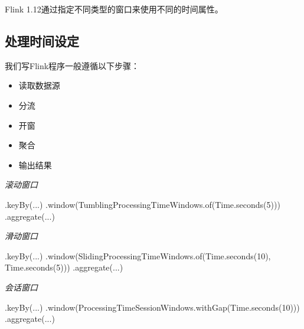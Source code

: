 \documentclass[cn,11pt,chinese]{elegantbook}
\newenvironment{Shaded}{}{}
\newcommand{\BuiltInTok}[1]{#1}
\newcommand{\DecValTok}[1]{\textcolor[rgb]{0.25,0.63,0.44}{#1}}
\newcommand{\FunctionTok}[1]{\textcolor[rgb]{0.02,0.16,0.49}{#1}}
\newcommand{\NormalTok}[1]{#1}
\providecommand{\tightlist}{%
  \setlength{\itemsep}{0pt}\setlength{\parskip}{0pt}}
\begin{document}
Flink 1.12通过指定不同类型的窗口来使用不同的时间属性。

\hypertarget{ux5904ux7406ux65f6ux95f4ux8bbeux5b9a}{%
\subsection{处理时间设定}\label{ux5904ux7406ux65f6ux95f4ux8bbeux5b9a}}

我们写Flink程序一般遵循以下步骤：

\begin{itemize}
\tightlist
\item
  读取数据源
\item
  分流
\item
  开窗
\item
  聚合
\item
  输出结果
\end{itemize}

\emph{滚动窗口}

\begin{Shaded}
\begin{Highlighting}[]
\NormalTok{.}\FunctionTok{keyBy}\NormalTok{(...)}
\NormalTok{.}\FunctionTok{window}\NormalTok{(TumblingProcessingTimeWindows.}\FunctionTok{of}\NormalTok{(}\BuiltInTok{Time}\NormalTok{.}\FunctionTok{seconds}\NormalTok{(}\DecValTok{5}\NormalTok{)))}
\NormalTok{.}\FunctionTok{aggregate}\NormalTok{(...)}
\end{Highlighting}
\end{Shaded}

\emph{滑动窗口}

\begin{Shaded}
\begin{Highlighting}[]
\NormalTok{.}\FunctionTok{keyBy}\NormalTok{(...)}
\NormalTok{.}\FunctionTok{window}\NormalTok{(SlidingProcessingTimeWindows.}\FunctionTok{of}\NormalTok{(}\BuiltInTok{Time}\NormalTok{.}\FunctionTok{seconds}\NormalTok{(}\DecValTok{10}\NormalTok{), }\BuiltInTok{Time}\NormalTok{.}\FunctionTok{seconds}\NormalTok{(}\DecValTok{5}\NormalTok{)))}
\NormalTok{.}\FunctionTok{aggregate}\NormalTok{(...)}
\end{Highlighting}
\end{Shaded}

\emph{会话窗口}

\begin{Shaded}
\begin{Highlighting}[]
\NormalTok{.}\FunctionTok{keyBy}\NormalTok{(...)}
\NormalTok{.}\FunctionTok{window}\NormalTok{(ProcessingTimeSessionWindows.}\FunctionTok{withGap}\NormalTok{(}\BuiltInTok{Time}\NormalTok{.}\FunctionTok{seconds}\NormalTok{(}\DecValTok{10}\NormalTok{)))}
\NormalTok{.}\FunctionTok{aggregate}\NormalTok{(...)}
\end{Highlighting}
\end{Shaded}
\end{document}
